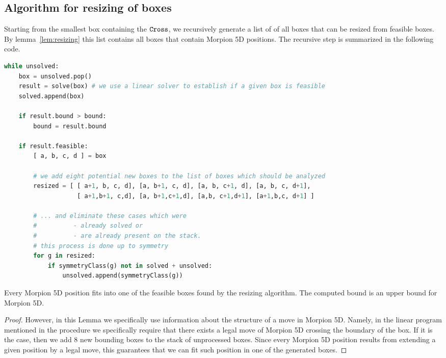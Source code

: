 \subsection{Algorithm for resizing of boxes}
Starting from the smallest box containing the $\texttt{Cross}$, we recursively generate a list of of all boxes 
  that can be resized from feasible boxes.
By lemma~\ref{lem:resizing} this list contains all boxes that contain Morpion 5D positions.
The recursive step is summarized in the following code.
\begin{lstlisting}[language = Python,
  basicstyle=\ttfamily\scriptsize,keywordstyle=\color{red},backgroundcolor=\color{white}]
while unsolved:
    box = unsolved.pop()
    result = solve(box) # we use a linear solver to establish if a given box is feasible
    solved.append(box)

    if result.bound > bound:
        bound = result.bound
        
    if result.feasible:
        [ a, b, c, d ] = box

        # we add eight potential new boxes to the list of boxes which should be analyzed
        resized = [ [ a+1, b, c, d], [a, b+1, c, d], [a, b, c+1, d], [a, b, c, d+1],
                    [ a+1,b+1, c,d], [a, b+1,c+1,d], [a,b, c+1,d+1], [a+1,b,c, d+1] ]
        
        # ... and eliminate these cases which were 
        #          - already solved or 
        #          - are already present on the stack.
        # this process is done up to symmetry 
        for g in resized:
            if symmetryClass(g) not in solved + unsolved:
                unsolved.append(symmetryClass(g))
\end{lstlisting}

\begin{lemma}
Every Morpion 5D position fits into one of the feasible boxes found by the resizing algorithm.
The computed bound is an upper bound for Morpion 5D.
\end{lemma}

\begin{proof}

However, in this Lemma we specifically use information about the structure of a move in Morpion 5D. Namely, in the linear program mentioned in the procedure we specifically require that there 
exists a legal move of Morpion 5D crossing the boundary of the box. If it is the case, then we add $8$ new bounding boxes to the stack of unprocessed boxes. Since every
Morpion 5D position results from extending a given position by a legal move, this guarantees that we can fit such position in one of the generated boxes. 
\end{proof} 

